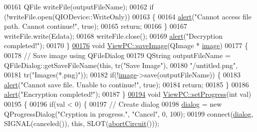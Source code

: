 \begin{DoxyCode}
00161     QFile writeFile(outputFileName);
00162     \textcolor{keywordflow}{if} (!writeFile.open(QIODevice::WriteOnly))
00163     \{
00164         \mbox{\hyperlink{class_view_p_c_a7c467169467789561078abc9d4fe57bd}{alert}}(\textcolor{stringliteral}{"Cannot access file path. Cannot continue!"}, \textcolor{keyword}{true});
00165         \textcolor{keywordflow}{return};
00166     \}
00167     writeFile.write(Edata);
00168     writeFile.close();
00169     \mbox{\hyperlink{class_view_p_c_a7c467169467789561078abc9d4fe57bd}{alert}}(\textcolor{stringliteral}{"Decryption completed!"});
00170 \}
\mbox{\hyperlink{class_view_p_c_a7901ce10ffaaf2387bef1db7feea342d}{00176}} \textcolor{keywordtype}{void} \mbox{\hyperlink{class_view_p_c_a7901ce10ffaaf2387bef1db7feea342d}{ViewPC::saveImage}}(QImage * \mbox{\hyperlink{namespacetests-setup_ad55b685280f549e15688a94cbb89f512}{image}})
00177 \{
00178     \textcolor{comment}{// Save image using QFileDialog}
00179     QString outputFileName = QFileDialog::getSaveFileName(\textcolor{keyword}{this}, tr(\textcolor{stringliteral}{"Save Image"}),
00180                                \textcolor{stringliteral}{"/untitled.png"},
00181                                tr(\textcolor{stringliteral}{"Images(*.png)"}));
00182     \textcolor{keywordflow}{if}(!\mbox{\hyperlink{namespacetests-setup_ad55b685280f549e15688a94cbb89f512}{image}}->save(outputFileName)) \{
00183         \mbox{\hyperlink{class_view_p_c_a7c467169467789561078abc9d4fe57bd}{alert}}(\textcolor{stringliteral}{"Cannot save file. Unable to continue!"}, \textcolor{keyword}{true});
00184         \textcolor{keywordflow}{return};
00185     \}
00186     \mbox{\hyperlink{class_view_p_c_a7c467169467789561078abc9d4fe57bd}{alert}}(\textcolor{stringliteral}{"Encryption completed!"});
00187 \}
\mbox{\hyperlink{class_view_p_c_a9c32a1fdb6ead84e5ada8fba8860c7ed}{00194}} \textcolor{keywordtype}{void} \mbox{\hyperlink{class_view_p_c_a9c32a1fdb6ead84e5ada8fba8860c7ed}{ViewPC::setProgress}}(\textcolor{keywordtype}{int} val)
00195 \{
00196     \textcolor{keywordflow}{if}(val < 0) \{
00197         \textcolor{comment}{// Create dialog}
00198         \mbox{\hyperlink{class_view_p_c_a31abbb470fe329b44e6ffee202b903ca}{dialog}} = \textcolor{keyword}{new} QProgressDialog(\textcolor{stringliteral}{"Cryption in progress."}, \textcolor{stringliteral}{"Cancel"}, 0, 100);
00199         connect(\mbox{\hyperlink{class_view_p_c_a31abbb470fe329b44e6ffee202b903ca}{dialog}}, SIGNAL(canceled()), \textcolor{keyword}{this}, SLOT(\mbox{\hyperlink{class_view_p_c_ad7ba2fcf1d17862de15e32432823f7b0}{abortCircuit}}()));

\end{DoxyCode}
